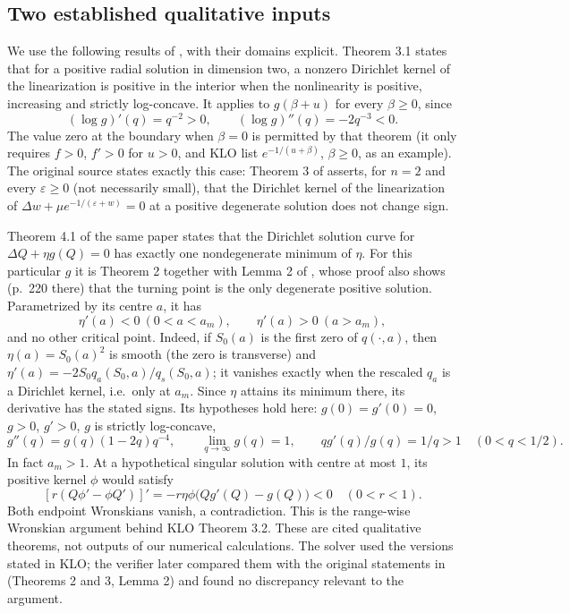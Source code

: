 \documentclass[11pt,a4paper]{report}
\begin{document}
\subsection{Two established qualitative inputs}
We use the following results of \autocite{KLO2017}, with their domains explicit.
Theorem 3.1 states that for a positive radial solution in dimension two, a
nonzero Dirichlet kernel of the linearization is positive in the interior
when the nonlinearity is positive, increasing and strictly log-concave.
It applies to $g(\beta+u)$ for every $\beta\geq0$, since
\[
 (\log g)'(q)=q^{-2}>0,\qquad (\log g)''(q)=-2q^{-3}<0.
\]
The value zero at the boundary when $\beta=0$ is permitted by that theorem
(it only requires $f>0$, $f'>0$ for $u>0$, and KLO list $e^{-1/(u+\beta)}$,
$\beta\ge0$, as an example). The original source states exactly this case:
Theorem 3 of \autocite{DuLou2001} asserts, for $n=2$ and every $\varepsilon\ge0$
(not necessarily small), that the Dirichlet kernel of the linearization of
$\Delta w+\mu e^{-1/(\varepsilon+w)}=0$ at a positive degenerate solution does
not change sign.

Theorem 4.1 of the same paper states that the Dirichlet solution curve for
$\Delta Q+\eta g(Q)=0$ has exactly one nondegenerate minimum of $\eta$.
For this particular $g$ it is Theorem 2 together with Lemma 2 of
\autocite{DuLou2001}, whose proof also shows (p.~220 there) that the turning
point is the only degenerate positive solution.
Parametrized by its centre $a$, it has
\begin{equation}\label{eq:limitcurve}
 \eta'(a)<0\ (0<a<a_m),\qquad \eta'(a)>0\ (a>a_m),
\end{equation}
and no other critical point. Indeed, if $S_0(a)$ is the first zero of
$q(\cdot,a)$, then $\eta(a)=S_0(a)^2$ is smooth (the zero is transverse) and
$\eta'(a)=-2S_0q_a(S_0,a)/q_s(S_0,a)$; it vanishes exactly when the rescaled
$q_a$ is a Dirichlet kernel, i.e.\ only at $a_m$. Since $\eta$ attains its
minimum there, its derivative has the stated signs. Its hypotheses hold here: $g(0)=g'(0)=0$,
$g>0$, $g'>0$, $g$ is strictly log-concave,
\[
 g''(q)=g(q)(1-2q)q^{-4},\qquad \lim_{q\to\infty}g(q)=1,
 \qquad qg'(q)/g(q)=1/q>1\quad(0<q<1/2).
\]
In fact $a_m>1$. At a hypothetical singular solution with centre at most
$1$, its positive kernel $\phi$ would satisfy
\[
 [r(Q\phi'-\phi Q')]'=-r\eta\phi\bigl(Qg'(Q)-g(Q)\bigr)<0
 \quad(0<r<1).
\]
Both endpoint Wronskians vanish, a contradiction. This is the range-wise
Wronskian argument behind KLO Theorem 3.2. These are cited qualitative theorems,
not outputs of our numerical calculations. The solver used the versions stated
in KLO; the verifier later compared them with the original statements in
\autocite{DuLou2001} (Theorems 2 and 3, Lemma 2) and found no discrepancy
relevant to the argument.
\end{document}
